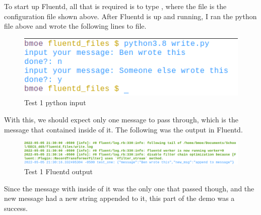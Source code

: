 \documentclass{article}
\begin{document}
To start up Fluentd, all that is required is to type , where the  file is the configuration file shown above. After Fluentd is up and running, I ran the python file above and wrote the following lines
to file.
\begin{figure}[H]
    \centering
    \includegraphics[scale=0.8]{images/t1_3.png}
    \caption{Test 1 python input}
    \label{fig:pic5}
\end{figure}
With this, we should expect only one message to pass through, which is the message that contained  inside of it. The following was the output in Fluentd.
\begin{figure}[H]
    \centering
    \includegraphics[scale=0.55]{images/t1_4.png}
    \caption{Test 1 Fluentd output}
    \label{fig:pic6}
\end{figure}
Since the message with  inside of it was the only one that passed though, and the new message had a new string appended to it, this part of the demo was a success.
\end{document}
